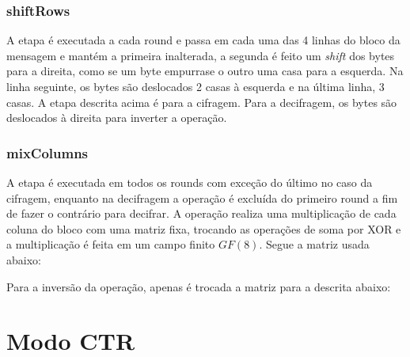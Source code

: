 \documentclass[12pt]{article}
\begin{document}
\subsubsection{shiftRows}
A etapa é executada a cada round e passa em cada uma das 4 linhas do bloco da mensagem e mantém a primeira inalterada, a segunda é feito um \textit{shift} dos bytes para a direita, como se um byte empurrase o outro uma casa para a esquerda. Na linha seguinte, os bytes são deslocados 2 casas à esquerda e na última linha, 3 casas. A etapa descrita acima é para a cifragem. Para a decifragem, os bytes são deslocados à direita para inverter a operação.

\subsubsection{mixColumns}
A etapa é executada em todos os rounds com exceção do último no caso da cifragem, enquanto na decifragem a operação é excluída do primeiro round a fim de fazer o contrário para decifrar. A operação realiza uma multiplicação de cada coluna do bloco com uma matriz fixa, trocando as operações de soma por XOR e a multiplicação é feita em um campo finito $GF(8)$. Segue a matriz usada abaixo:

\begin{center}
\end{center}

Para a inversão da operação, apenas é trocada a matriz para a descrita abaixo:

\begin{center}
\end{center}

\section{Modo CTR}
\end{document}

